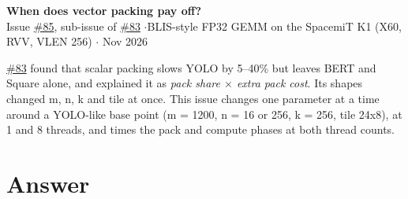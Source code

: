\documentclass[10pt,a4paper]{article}
\newcommand{\iss}[1]{\href{https://github.com/JieGH/RVV_code_gen_via_MLIR_xDSL/issues/#1}{\##1}}
\begin{document}
\begin{center}
{\Large\bfseries When does vector packing pay off?}\\[4pt]
Issue \iss{85}, sub-issue of \iss{83} \quad$\cdot$\quad BLIS-style FP32 GEMM on the SpacemiT K1 (X60, RVV, VLEN 256) \quad$\cdot$ Nov 2026
\end{center}

\noindent \iss{83} found that scalar packing slows YOLO by 5--40\% but leaves BERT and Square alone, and explained it as
\emph{pack share $\times$ extra pack cost}. Its shapes changed m, n, k and tile at once. This issue changes one
parameter at a time around a YOLO-like base point (m = 1200, n = 16 or 256, k = 256, tile 24x8), at 1 and 8 threads,
and times the pack and compute phases at both thread counts.

\section*{Answer}
\end{document}
